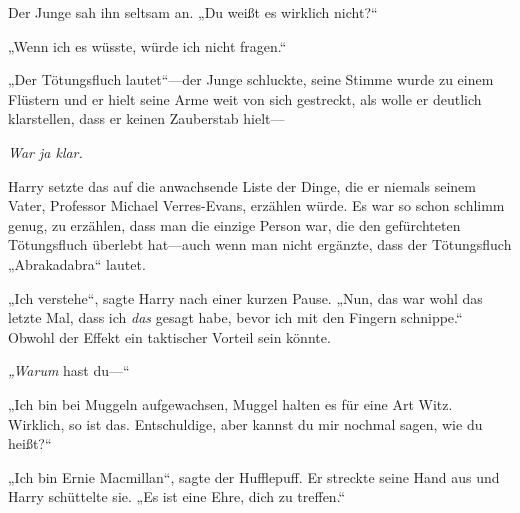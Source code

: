 Der Junge sah ihn seltsam an. „Du weißt es wirklich nicht?“

„Wenn ich es wüsste, würde ich nicht fragen.“

„Der Tötungsfluch lautet“—der Junge schluckte, seine Stimme wurde zu einem Flüstern und er hielt seine Arme weit von sich gestreckt, als wolle er deutlich klarstellen, dass er keinen Zauberstab hielt— 

\emph{War ja klar.}

Harry setzte das auf die anwachsende Liste der Dinge, die er niemals seinem Vater, Professor Michael Verres-Evans, erzählen würde. Es war so schon schlimm genug, zu erzählen, dass man die einzige Person war, die den gefürchteten Tötungsfluch überlebt hat—auch wenn man nicht ergänzte, dass der Tötungsfluch „Abrakadabra“ lautet.

„Ich verstehe“, sagte Harry nach einer kurzen Pause. „Nun, das war wohl das letzte Mal, dass ich \emph{das} gesagt habe, bevor ich mit den Fingern schnippe.“ Obwohl der Effekt ein taktischer Vorteil sein könnte.

\emph{„Warum} hast du—“

„Ich bin bei Muggeln aufgewachsen, Muggel halten es für eine Art Witz. Wirklich, so ist das. Entschuldige, aber kannst du mir nochmal sagen, wie du heißt?“

„Ich bin Ernie Macmillan“, sagte der Hufflepuff. Er streckte seine Hand aus und Harry schüttelte sie. „Es ist eine Ehre, dich zu treffen.“

